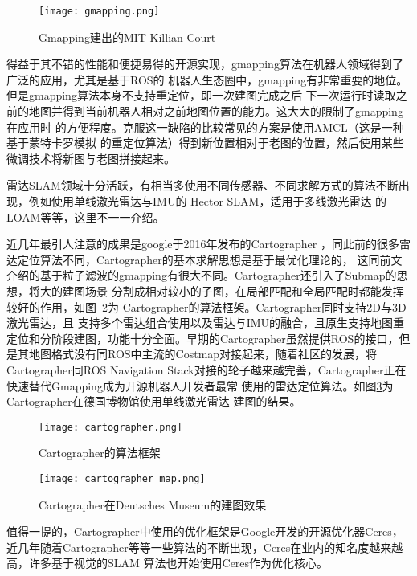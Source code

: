 \begin{figure}
  \centering
  \texttt{[image: gmapping.png]}
  \caption{Gmapping建出的MIT Killian Court}
  \label{fig:gmapping}
\end{figure}

得益于其不错的性能和便捷易得的开源实现，gmapping算法在机器人领域得到了广泛的应用，尤其是基于ROS的
机器人生态圈中，gmapping有非常重要的地位。但是gmapping算法本身不支持重定位，即一次建图完成之后
下一次运行时读取之前的地图并得到当前机器人相对之前地图位置的能力。这大大的限制了gmapping在应用时
的方便程度。克服这一缺陷的比较常见的方案是使用AMCL\cite{fox2002kld}（这是一种基于蒙特卡罗模拟
的重定位算法）得到新位置相对于老图的位置，然后使用某些微调技术将新图与老图拼接起来。

雷达SLAM领域十分活跃，有相当多使用不同传感器、不同求解方式的算法不断出现，例如使用单线激光雷达与IMU的
Hector SLAM\cite{KohlbrecherMeyerStrykKlingaufFlexibleSlamSystem2011}，适用于多线激光雷达
的LOAM\cite{zhang2014loam}等等，这里不一一介绍。

近几年最引人注意的成果是google于2016年发布的Cartographer
\cite{hess2016real}，同此前的很多雷达定位算法不同，Cartographer的基本求解思想是基于最优化理论的，
这同前文介绍的基于粒子滤波的gmapping有很大不同。Cartographer还引入了Submap的思想，将大的建图场景
分割成相对较小的子图，在局部匹配和全局匹配时都能发挥较好的作用，如图~\ref{fig:cartographer}为
Cartographer的算法框架。Cartographer同时支持2D与3D激光雷达，且
支持多个雷达组合使用以及雷达与IMU的融合，且原生支持地图重定位和分阶段建图，功能十分全面。早期的Cartographer虽然提供ROS的接口，但是其地图格式没有同ROS中主流的Costmap对接起来，随着社区的发展，将Cartographer同ROS
Navigation Stack对接的轮子越来越完善，Cartographer正在快速替代Gmapping成为开源机器人开发者最常
使用的雷达定位算法。如图\ref{fig:cartographer_map}为Cartographer在德国博物馆使用单线激光雷达
建图的结果。

\begin{figure}[h] %
  \centering
  \texttt{[image: cartographer.png]}
  \caption{Cartographer的算法框架}
  \label{fig:cartographer}
\end{figure}

\begin{figure}
  \centering
  \texttt{[image: cartographer\_map.png]}
  \caption{Cartographer在Deutsches Museum的建图效果}
  \label{fig:cartographer_map}
\end{figure}



值得一提的，Cartographer中使用的优化框架是Google开发的开源优化器Ceres\cite{ceres-solver}，
近几年随着Cartographer等等一些算法的不断出现，Ceres在业内的知名度越来越高，许多基于视觉的SLAM
算法也开始使用Ceres作为优化核心。

